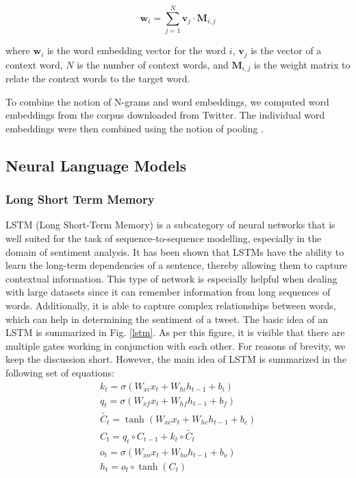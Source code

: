 \begin{equation}
  \mathbf{w}_{i} = \sum_{j=1}^{N} \mathbf{v}_{j} \cdot \mathbf{M}_{i,j}
\end{equation}

where $\mathbf{w}_{i}$ is the word embedding vector for the word $i$, $\mathbf{v}_{j}$ is the vector of a context word, $N$ is the number of context words, and $\mathbf{M}_{i,j}$ is the weight matrix to relate the context words to the target word.


To combine the notion of N-grams and word embeddings, we computed word embeddings from the corpus downloaded from Twitter. The individual word embeddings were then combined using the notion of pooling \cite{lev2015defense}.


\subsection{Neural Language Models}
\subsubsection{Long Short Term Memory}

LSTM (Long Short-Term Memory) is a subcategory of neural networks that is well suited for the task of sequence-to-sequence modelling, especially in the domain of sentiment analysis. It has been shown that LSTMs have the ability to learn the long-term dependencies of a sentence, thereby allowing them to capture contextual information. This type of network is especially helpful when dealing with large datasets since it can remember information from long sequences of words. Additionally, it is able to capture complex relationships between words, which can help in determining the sentiment of a tweet. The basic idea of an LSTM is summarized in Fig. \ref{lstm}. As per this figure, it is visible that there are multiple gates working in conjunction with each other. For reasons of brevity, we keep the discussion short. However, the main idea of LSTM is summarized in the following set of equations:
\begin{align}
k_t = \sigma(W_{xi}x_t + W_{hi}h_{t-1} + b_i) \\ 
q_t = \sigma(W_{xf}x_t + W_{hf}h_{t-1} + b_f) \\ 
\tilde{C_t} = \tanh(W_{xc}x_t + W_{hc}h_{t-1} + b_c) \\ 
C_t = q_t \circ C_{t-1} + k_t \circ \tilde{C_t} \\ 
o_t = \sigma(W_{xo}x_t + W_{ho}h_{t-1} + b_o) \\ 
h_t = o_t \circ \tanh(C_t) 
\end{align}


